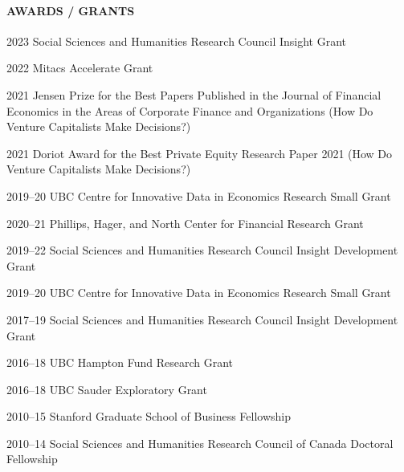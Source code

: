 \documentclass[11pt]{article}
\begin{document}
\paragraph{AWARDS / GRANTS}
\begin{datelist}
    \item[2023] Social Sciences and Humanities Research Council Insight Grant
    \item[2022] Mitacs Accelerate Grant
    \item[2021] Jensen Prize for the Best Papers Published in the Journal of Financial Economics in the Areas of Corporate Finance and Organizations (How Do Venture Capitalists Make Decisions?)
    \item[2021] Doriot Award for the Best Private Equity Research Paper 2021 (How Do Venture Capitalists Make Decisions?)
    \item[2019--20] UBC Centre for Innovative Data in Economics Research Small Grant
    \item[2020--21] Phillips, Hager, and North Center for Financial Research Grant
    \item[2019--22] Social Sciences and Humanities Research Council Insight Development Grant
    \item[2019--20] UBC Centre for Innovative Data in Economics Research Small Grant
    \item[2017--19] Social Sciences and Humanities Research Council Insight Development Grant
    \item[2016--18] UBC Hampton Fund Research Grant
    \item[2016--18] UBC Sauder Exploratory Grant
    \item[2010--15] Stanford Graduate School of Business Fellowship
    \item[2010--14] Social Sciences and Humanities Research Council of Canada Doctoral Fellowship
\end{datelist}
\end{document}
